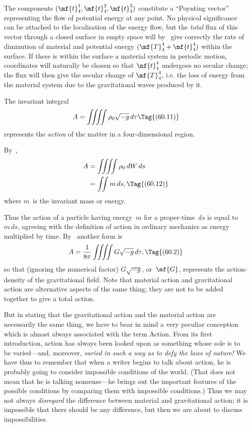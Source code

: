 \documentclass[12pt]{book}
\begin{document}
The components $(\mf{t}_4^1,\mf{t}_4^2,\mf{t}_4^3)$ constitute a ``Poynting vector'' representing the flow of
potential energy at any point.
No physical significance can be attached to the localisation of the energy flow, but the \emph{total} flux of this
vector through a closed surface in empty space will by~ give correctly the rate of diminution of material
and potential energy $(\mf{T}_4^4 + \mf{t}_4^4)$ within the surface.
If there is within the surface a material system in periodic motion, coordinates will naturally be chosen so that
$\mf{t}_4^4$ undergoes no secular change; the flux will then give the secular change of $\mf{T}_4^4$, i.e. the loss of
energy from the material system due to the gravitational waves produced by it.


The invariant integral
\[
A = \iiiint \rho_{0} \sqrt{-g}\, d\tau
\Tag{(60.11)}
\]
represents the \emph{action} of the matter in a four-dimensional region.

By~,
\begin{align*}
  A &= \iiiint \rho_{0}\, dW\, ds \\
  &= \iint m\, ds,
  \Tag{(60.12)}
\end{align*}
where $m$~is the invariant mass or energy.

Thus the action of a particle having energy~$m$ for a proper-time~$ds$ is
equal to~$m\, ds$, agreeing with the definition of action in ordinary mechanics as
energy multiplied by time. By~ another form is
\[
A = \frac{1}{8\pi} \iiiint G\sqrt{-g}\, d\tau,
\Tag{(60.2)}
\]
so that (ignoring the numerical factor) $G\sqrt{-g}$, or~$\mf{G}$, represents the action-density
of the gravitational field. Note that material action and gravitational
action are alternative aspects of the same thing; they are not to be added
together to give a total action.

But in stating that the gravitational action and the material action are
necessarily the same thing, we have to bear in mind a very peculiar conception
which is almost always associated with the term Action. From its first introduction,
action has always been looked upon as something whose sole 
is to be varied---and, moreover, \emph{varied in such a way as to defy the laws
of nature!} We have thus to remember that when a writer begins to talk
about action, he is probably going to consider impossible conditions of the
world. (That does not mean that he is talking nonsense---he brings out the
important features of the possible conditions by comparing them with impossible
conditions.) Thus we may not always \emph{disregard} the difference between material
and gravitational action; it is impossible that there should be any difference,
but then we are about to discuss impossibilities.
\end{document}
